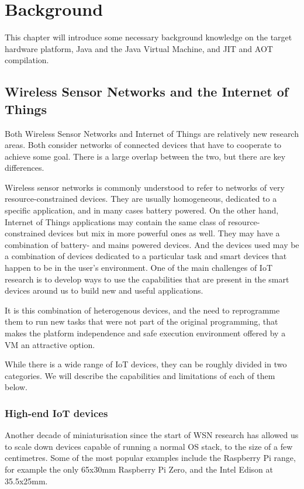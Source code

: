 \chapter{Background}
This chapter will introduce some necessary background knowledge on the target hardware platform, Java and the Java Virtual Machine, and JIT and AOT compilation.

\section{Wireless Sensor Networks and the Internet of Things}
Both Wireless Sensor Networks and Internet of Things are relatively new research areas. Both consider networks of connected devices that have to cooperate to achieve some goal. There is a large overlap between the two, but there are key differences.

Wireless sensor networks is commonly understood to refer to networks of very resource-constrained devices. They are usually homogeneous, dedicated to a specific application, and in many cases battery powered. On the other hand, Internet of Things applications may contain the same class of resource-constrained devices but mix in more powerful ones as well. They may have a combination of battery- and mains powered devices. And the devices used may be a combination of devices dedicated to a particular task and smart devices that happen to be in the user's environment. One of the main challenges of IoT research is to develop ways to use the capabilities that are present in the smart devices around us to build new and useful applications.

It is this combination of heterogenous devices, and the need to reprogramme them to run new tasks that were not part of the original programming, that makes the platform independence and safe execution environment offered by a VM an attractive option.

While there is a wide range of IoT devices, they can be roughly divided in two categories. We will describe the capabilities and limitations of each of them below. 


\subsection{High-end IoT devices}
Another decade of miniaturisation since the start of WSN research has allowed us to scale down devices capable of running a normal OS stack, to the size of a few centimetres. Some of the most popular examples include the Raspberry Pi range, for example the only 65x30mm Raspberry Pi Zero, and the Intel Edison at 35.5x25mm.


